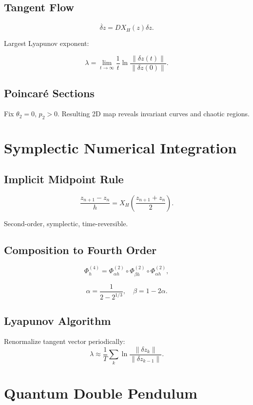 \documentclass[11pt,oneside]{book}
\begin{document}
\section{Tangent Flow}

\[
\dot{\delta z}=DX_H(z)\delta z.
\]

Largest Lyapunov exponent:

\[
\lambda=\lim_{t\to\infty}
\frac1t\ln\frac{\|\delta z(t)\|}{\|\delta z(0)\|}.
\]

\section{Poincar\'e Sections}

Fix $\theta_2=0$, $p_2>0$.
Resulting 2D map reveals invariant curves and chaotic regions.

\chapter{Symplectic Numerical Integration}

\section{Implicit Midpoint Rule}

\[
\frac{z_{n+1}-z_n}{h}
=
X_H\left(\frac{z_{n+1}+z_n}{2}\right).
\]

Second-order, symplectic, time-reversible.

\section{Composition to Fourth Order}

\[
\Phi_h^{(4)}
=
\Phi_{\alpha h}^{(2)}
\circ
\Phi_{\beta h}^{(2)}
\circ
\Phi_{\alpha h}^{(2)},
\]

\[
\alpha=\frac1{2-2^{1/3}}, \quad
\beta=1-2\alpha.
\]

\section{Lyapunov Algorithm}

Renormalize tangent vector periodically:
\[
\lambda\approx \frac1{T}
\sum_k \ln \frac{\|\delta z_k\|}{\|\delta z_{k-1}\|}.
\]

\chapter{Quantum Double Pendulum}
\end{document}

